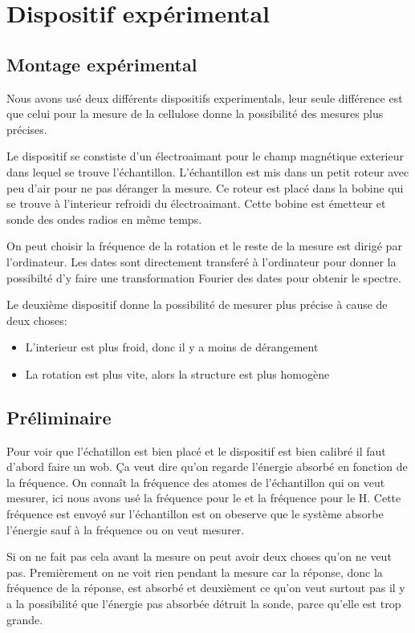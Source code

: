 \documentclass[a4paper,12pt]{scrartcl}
\begin{document}
 \section{Dispositif expérimental}
  \subsection{Montage expérimental}
   Nous avons usé deux différents dispositifs experimentals, leur seule différence est que celui pour la mesure de la cellulose donne la possibilité des mesures plus précises.

   Le dispositif se constiste d'un électroaimant pour le champ magnétique exterieur dans lequel se trouve l'échantillon. L'échantillon est mis dans un petit roteur avec peu d'air pour ne pas déranger la mesure. Ce roteur est placé dans la bobine qui se trouve à l'interieur refroidi du électroaimant. Cette bobine est émetteur et sonde des ondes radios en même temps. 

   On peut choisir la fréquence de la rotation et le reste de la mesure est dirigé par l'ordinateur. Les dates sont directement transferé à l'ordinateur pour donner la possibilté d'y faire une transformation Fourier des dates pour obtenir le spectre.

   Le deuxième dispositif donne la possibilité de mesurer plus précise à cause de deux choses:
   \begin{itemize}
    \item L'interieur est plus froid, donc il y a moins de dérangement
    \item La rotation est plus vite, alors la structure est plus homogène
   \end{itemize}


  \subsection{Préliminaire} 
   Pour voir que l'échatillon est bien placé et le dispositif est bien calibré il faut d'abord faire un \flqq wob\frqq. \c Ca veut dire qu'on regarde l'énergie absorbé en fonction de la fréquence. On connaît la fréquence des atomes de l'échantillon qui on veut mesurer, ici nous avons usé la fréquence pour le  et la fréquence pour le H. Cette fréquence est envoyé sur l'échantillon est on obeserve que le système absorbe l'énergie sauf à la fréquence ou on veut mesurer. 

   Si on ne fait pas cela avant la mesure on peut avoir deux choses qu'on ne veut pas. Premièrement on ne voit rien pendant la mesure car la réponse, donc la fréquence de la réponse, est absorbé et deuxièment ce qu'on veut surtout pas il y a la possibilité que l'énergie pas absorbée détruit la sonde, parce qu'elle est trop grande.
\end{document}
